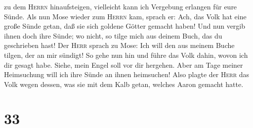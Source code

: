 zu dem \textsc{Herrn} hinaufsteigen, vielleicht kann ich Vergebung
erlangen für eure Sünde.  Als nun Mose wieder zum
\textsc{Herrn} kam, sprach er: Ach, das Volk hat eine große Sünde getan,
daß sie sich goldene Götter gemacht haben!  Und nun
vergib ihnen doch ihre Sünde; wo nicht, so tilge mich aus deinem Buch,
das du geschrieben hast!  Der \textsc{Herr} sprach zu
Mose: Ich will den aus meinem Buche tilgen, der an mir sündigt!
 So gehe nun hin und führe das Volk dahin, wovon ich dir
gesagt habe. Siehe, mein Engel soll vor dir hergehen. Aber am Tage
meiner Heimsuchung will ich ihre Sünde an ihnen heimsuchen!
 Also plagte der \textsc{Herr} das Volk wegen dessen, was
sie mit dem Kalb getan, welches Aaron gemacht hatte.

\hypertarget{section-32}{%
\section{33}\label{section-32}}

